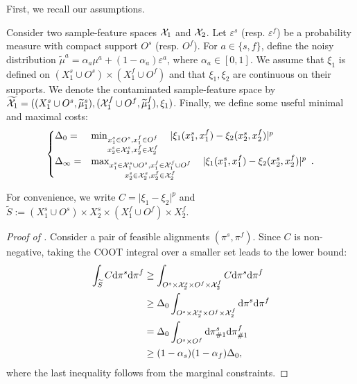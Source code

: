 First, we recall our assumptions.
\begin{assumption}
\label{assump:robust_copy}
Consider two sample-feature spaces $\mathcal X_1$ and $\mathcal X_2$.
Let $\varepsilon^s$ (resp. $\varepsilon^f$) be a probability measure with compact support $O^s$
(resp. $O^f$). For $a \in \{s, f\}$, define the noisy distribution
$\widetilde{\mu}^a = \alpha_a \mu^a + (1-\alpha_a) \varepsilon^a$, where $\alpha_a \in [0,1]$.
We assume that $\xi_1$ is defined on
$(X^s_1 \cup O^s) \times (X^f_1 \cup O^f)$ and that $\xi_1, \xi_2$
are continuous on their supports. We denote the contaminated sample-feature space by
$\widetilde{\mathcal X_1} = ((X^s_1 \cup O^s, \widetilde{\mu}^s_1),
(\mathcal X^f_1 \cup O^f, \widetilde{\mu}^f_1), \xi_1)$. Finally,
we define some useful minimal and maximal costs:
  \[
  \begin{cases}
  \Delta_{0} =& \min_{
  \substack{
       x_1^s \in O^s, x_1^f \in O^f  \\
       x_2^s \in \mathcal X_2^s, x_2^f \in \mathcal X_2^f
  }}\quad |\xi_1(x_1^s, x_1^f) - \xi_2(x_2^s, x_2^f)|^p \\
  \Delta_{\infty} =& \max_{
  \substack{
  x_1^s \in \mathcal X_1^s \cup O^s, x_1^f \in \mathcal X_1^f \cup O^f \\
  x_2^s \in \mathcal X_2^s, x_2^f \in \mathcal X_2^f
  }} \quad|\xi_1(x_1^s, x_1^f) - \xi_2(x_2^s, x_2^f)|^p \enspace.
  \end{cases}
\]
\end{assumption}
For convenience, we write $C = \vert \xi_1 - \xi_2 \vert^p$ and
$\widetilde{S} := (X^s_1 \cup O^s) \times X_2^s \times (X^f_1 \cup O^f) \times X_2^f$.
\begin{proof}[Proof of ]
Consider a pair of feasible alignments $(\pi^s, \pi^f)$. Since $C$ is non-negative,
taking the COOT integral over a smaller set leads to the lower bound:
\begin{equation}
    \begin{split}
        \int_{\widetilde{S}} C \mathrm d\pi^s\mathrm d\pi^f
        &\geq \int_{O^s \times \mathcal X_2^s \times O^f \times \mathcal X_2^f} C \mathrm d\pi^s\mathrm d\pi^f \\
          &\geq  \Delta_0 \int_{O^s \times \mathcal X_2^s \times O^f \times \mathcal X_2^f}  \mathrm d\pi^s\mathrm d\pi^f \\
          &= \Delta_0 \int_{O^s\times O^f}  \mathrm d\pi^s_{\#1} \mathrm d\pi^f_{\#1} \\
          &\geq (1 - \alpha_s)(1 -\alpha_f)\Delta_0,
    \end{split}
\end{equation}
where the last inequality follows from the marginal constraints.
\end{proof}


